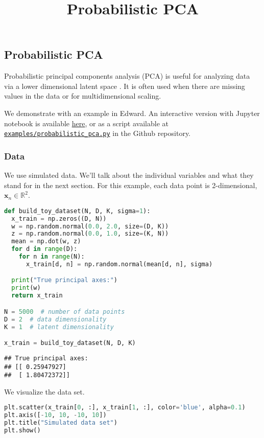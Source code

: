 \title{Probabilistic PCA}

\subsection{Probabilistic PCA}

Probabilistic principal components analysis (PCA) is
useful for analyzing data via a lower dimensional latent space
\citep{tipping1999probabilistic}. It is often
used when there are missing values in the data or for multidimensional
scaling.

We demonstrate with an example in Edward.
An interactive version with Jupyter notebook is available
\href{http://nbviewer.jupyter.org/github/blei-lab/edward/blob/master/docs/notebooks/probabilistic_pca.ipynb}{here},
or as a script available at
\href{https://github.com/blei-lab/edward/blob/master/examples/probabilistic_pca.py}
{\texttt{examples/probabilistic_pca.py}} in the Github repository.

\subsubsection{Data}

We use simulated data. We'll talk about the individual variables and
what they stand for in the next section. For this example, each data
point is 2-dimensional, $\mathbf{x}_n\in\mathbb{R}^2$.

\begin{lstlisting}[language=Python]
def build_toy_dataset(N, D, K, sigma=1):
  x_train = np.zeros((D, N))
  w = np.random.normal(0.0, 2.0, size=(D, K))
  z = np.random.normal(0.0, 1.0, size=(K, N))
  mean = np.dot(w, z)
  for d in range(D):
    for n in range(N):
      x_train[d, n] = np.random.normal(mean[d, n], sigma)

  print("True principal axes:")
  print(w)
  return x_train

N = 5000  # number of data points
D = 2  # data dimensionality
K = 1  # latent dimensionality

x_train = build_toy_dataset(N, D, K)
\end{lstlisting}

\begin{lstlisting}
## True principal axes:
## [[ 0.25947927]
##  [ 1.80472372]]
\end{lstlisting}

We visualize the data set.

\begin{lstlisting}[language=Python]
plt.scatter(x_train[0, :], x_train[1, :], color='blue', alpha=0.1)
plt.axis([-10, 10, -10, 10])
plt.title("Simulated data set")
plt.show()
\end{lstlisting}

